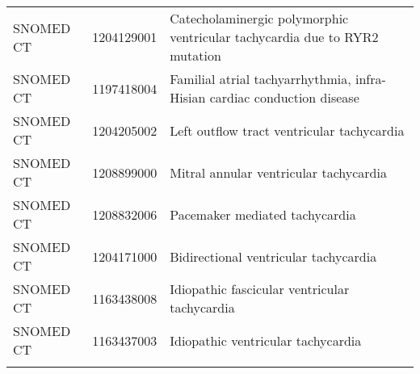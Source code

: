 \begin{longtable}{p{}p{}p{}}
  SNOMED CT & 1204129001 & Catecholaminergic polymorphic ventricular tachycardia due to RYR2 mutation \\ 
  SNOMED CT & 1197418004 & Familial atrial tachyarrhythmia, infra-Hisian cardiac conduction disease \\ 
  SNOMED CT & 1204205002 & Left outflow tract ventricular tachycardia \\ 
  SNOMED CT & 1208899000 & Mitral annular ventricular tachycardia \\ 
  SNOMED CT & 1208832006 & Pacemaker mediated tachycardia \\ 
  SNOMED CT & 1204171000 & Bidirectional ventricular tachycardia \\ 
  SNOMED CT & 1163438008 & Idiopathic fascicular ventricular tachycardia \\ 
  SNOMED CT & 1163437003 & Idiopathic ventricular tachycardia \\ 
  \hline
\label{tab:codes_palpitations_tachycardia}
\end{longtable}

